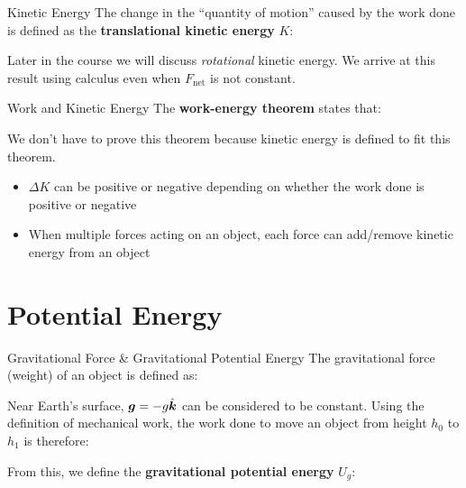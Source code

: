 \documentclass[12pt,compress,aspectratio=169]{beamer}
\newcommand{\kkk}{\ensuremath\hat{\bm{k}}}
\begin{document}
\begin{frame}{Kinetic Energy}
  The change in the ``quantity of motion'' caused by the work done is defined
  as the \textbf{translational kinetic energy} $K$:


  Later in the course we will discuss \emph{rotational} kinetic energy.
  We arrive at this result using calculus even when $F_\text{net}$ is not
  constant.
\end{frame}



\begin{frame}{Work and Kinetic Energy}
  The \textbf{work-energy theorem} states that:


  We don't have to prove this theorem because kinetic energy is defined to
  fit this theorem.
  \begin{itemize}
  \item $\Delta K$ can be positive or negative depending on whether the work
    done is positive or negative
  \item When multiple forces acting on an object, each force can add/remove
    kinetic energy from an object
  \end{itemize}
\end{frame}



\section{Potential Energy}

\begin{frame}{Gravitational Force \& Gravitational Potential Energy}
  The gravitational force (weight) of an object is defined as:
  
  
  \vspace{-.1in}Near Earth's surface, $\bm{g}=-g\kkk$ can be considered to be
  constant. Using the definition of mechanical work, the work done to move an
  object from height $h_0$ to $h_1$ is therefore:

  \eq{-.2in}{
    W=\bm{w}\cdot\Delta\bm{h}
    =-mg\kkk\cdot\Delta h\kkk
    =-\left[mgh_1-mgh_0\right]%
  }

  From this, we define the \textbf{gravitational potential energy} $U_g$:

\end{frame}
\end{document}
